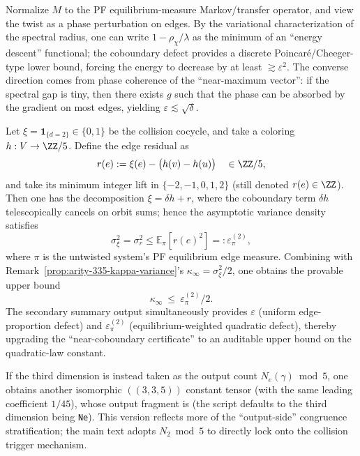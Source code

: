 \begin{remark}\label{rem:coboundary-defect-proof}
Normalize $M$ to the PF equilibrium-measure Markov/transfer operator, and view the twist as a phase perturbation on edges. By the variational characterization of the spectral radius, one can write $1-\rho_\chi/\lambda$ as the minimum of an ``energy descent'' functional; the coboundary defect provides a discrete Poincar\'e/Cheeger-type lower bound, forcing the energy to decrease by at least \(\gtrsim \varepsilon^2\). The converse direction comes from phase coherence of the ``near-maximum vector'': if the spectral gap is tiny, then there exists \(g\) such that the phase can be absorbed by the gradient on most edges, yielding \(\varepsilon\lesssim \sqrt{\delta}\).
\end{remark}

\begin{remark}[Provable upper bound from ``best coloring'': \texorpdfstring{$\kappa_\infty\le \varepsilon_\pi^{(2)}/2$}{kappa <= eps/2}]\label{rem:arity-335-eps-bound}
Let \(\xi=\mathbf{1}_{\{d=2\}}\in\{0,1\}\) be the collision cocycle, and take a coloring \(h:V\to\ZZ/5\).
Define the edge residual as
$$
r(e):=\xi(e)-\bigl(h(v)-h(u)\bigr)\quad\in\ZZ/5,
$$
and take its minimum integer lift in \(\{-2,-1,0,1,2\}\) (still denoted \(r(e)\in\ZZ\)).
Then one has the decomposition \(\xi=\delta h+r\), where the coboundary term \(\delta h\) telescopically cancels on orbit sums; hence the asymptotic variance density satisfies
$$
\sigma_\xi^2=\sigma_r^2\le \mathbb{E}_\pi[r(e)^2]=:\varepsilon_\pi^{(2)},
$$
where \(\pi\) is the untwisted system's PF equilibrium edge measure.
Combining with Remark~\ref{prop:arity-335-kappa-variance}'s \(\kappa_\infty=\sigma_\xi^2/2\), one obtains the provable upper bound
$$
\kappa_\infty\ \le\ \varepsilon_\pi^{(2)}/2.
$$
The secondary summary output simultaneously provides \(\varepsilon\) (uniform edge-proportion defect) and \(\varepsilon_\pi^{(2)}\) (equilibrium-weighted quadratic defect), thereby upgrading the ``near-coboundary certificate'' to an auditable upper bound on the quadratic-law constant.
\end{remark}

\begin{remark}\label{rem:arity-335-ne-mod5}
If the third dimension is instead taken as the output count $N_e(\gamma)\bmod 5$, one obtains another isomorphic $((3,3,5))$ constant tensor (with the same leading coefficient $1/45$), whose output fragment is
\verb||
(the script defaults to the third dimension being \texttt{Ne}). This version reflects more of the ``output-side'' congruence stratification; the main text adopts $N_2\bmod 5$ to directly lock onto the collision trigger mechanism.
\end{remark}


